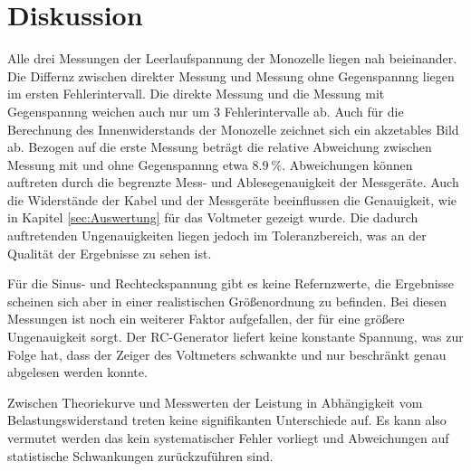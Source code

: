 \section{Diskussion}
\label{sec:Diskussion}

Alle drei Messungen der Leerlaufspannung der Monozelle liegen nah beieinander.
Die Differnz zwischen direkter Messung und Messung ohne Gegenspannng liegen im ersten Fehlerintervall.
Die direkte Messung und die Messung mit Gegenspannng weichen auch nur um 3 Fehlerintervalle ab.
Auch für die Berechnung des Innenwiderstands der Monozelle zeichnet sich ein akzetables Bild ab.
Bezogen auf die erste Messung beträgt die relative Abweichung zwischen Messung mit und ohne Gegenspannng etwa $\SI{8.9}{\percent}$.
Abweichungen können auftreten durch die begrenzte Mess- und Ablesegenauigkeit der Messgeräte.
Auch die Widerstände der Kabel  und der Messgeräte beeinflussen die Genauigkeit, wie in Kapitel \ref{sec:Auswertung} für das Voltmeter gezeigt wurde.
Die dadurch auftretenden Ungenauigkeiten liegen jedoch im Toleranzbereich, was an der Qualität der Ergebnisse zu sehen ist.

\noindent
Für die Sinus- und Rechteckspannung gibt es keine Refernzwerte, die Ergebnisse scheinen sich aber in einer realistischen Größenordnung zu befinden.
Bei diesen Messungen ist noch ein weiterer Faktor aufgefallen, der für eine größere Ungenauigkeit sorgt.
Der RC-Generator liefert keine konstante Spannung, was zur Folge hat, dass der Zeiger des Voltmeters schwankte und nur beschränkt genau abgelesen werden konnte.

\noindent
Zwischen Theoriekurve und Messwerten der Leistung in Abhängigkeit vom Belastungswiderstand treten keine signifikanten Unterschiede auf.
Es kann also vermutet werden das kein systematischer Fehler vorliegt und Abweichungen auf statistische Schwankungen zurückzuführen sind.

